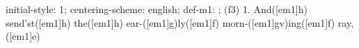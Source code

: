 initial-style: 1;
centering-scheme: english;
def-m1: \grealign;
(f3) 1. And([em1]h) send'st([em1]h) the([em1]h) ear-([em1]g)ly([em1]f) morn-([em1]gv)ing([em1]f) ray,([em1]e)